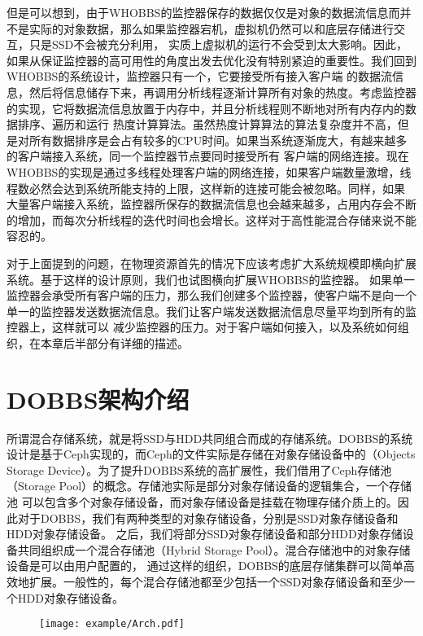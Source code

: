 但是可以想到，由于WHOBBS的监控器保存的数据仅仅是对象的数据流信息而并不是实际的对象数据，那么如果监控器宕机，虚拟机仍然可以和底层存储进行交互，只是SSD不会被充分利用，
实质上虚拟机的运行不会受到太大影响。因此，如果从保证监控器的高可用性的角度出发去优化没有特别紧迫的重要性。我们回到WHOBBS的系统设计，监控器只有一个，它要接受所有接入客户端
的数据流信息，然后将信息储存下来，再调用分析线程逐渐计算所有对象的热度。考虑监控器的实现，它将数据流信息放置于内存中，并且分析线程则不断地对所有内存内的数据排序、遍历和运行
热度计算算法。虽然热度计算算法的算法复杂度并不高，但是对所有数据排序是会占有较多的CPU时间。如果当系统逐渐庞大，有越来越多的客户端接入系统，同一个监控器节点要同时接受所有
客户端的网络连接。现在WHOBBS的实现是通过多线程处理客户端的网络连接，如果客户端数量激增，线程数必然会达到系统所能支持的上限，这样新的连接可能会被忽略。同样，如果
大量客户端接入系统，监控器所保存的数据流信息也会越来越多，占用内存会不断的增加，而每次分析线程的迭代时间也会增长。这样对于高性能混合存储来说不能容忍的。

对于上面提到的问题，在物理资源首先的情况下应该考虑扩大系统规模即横向扩展系统。基于这样的设计原则，我们也试图横向扩展WHOBBS的监控器。
如果单一监控器会承受所有客户端的压力，那么我们创建多个监控器，使客户端不是向一个单一的监控器发送数据流信息。我们让客户端发送数据流信息尽量平均到所有的监控器上，这样就可以
减少监控器的压力。对于客户端如何接入，以及系统如何组织，在本章后半部分有详细的描述。

\section{DOBBS架构介绍}
所谓混合存储系统，就是将SSD与HDD共同组合而成的存储系统。DOBBS的系统设计是基于Ceph实现的，而Ceph的文件实际是存储在对象存储设备中的（Objects 
Storage Device）。为了提升DOBBS系统的高扩展性，我们借用了Ceph存储池（Storage Pool）的概念。存储池实际是部分对象存储设备的逻辑集合，一个存储池
可以包含多个对象存储设备，而对象存储设备是挂载在物理存储介质上的。因此对于DOBBS，我们有两种类型的对象存储设备，分别是SSD对象存储设备和HDD对象存储设备。
之后，我们将部分SSD对象存储设备和部分HDD对象存储设备共同组织成一个混合存储池（Hybrid Storage Pool）。混合存储池中的对象存储设备是可以由用户配置的，
通过这样的组织，DOBBS的底层存储集群可以简单高效地扩展。一般性的，每个混合存储池都至少包括一个SSD对象存储设备和至少一个HDD对象存储设备。

\begin{figure}[!htp]
    \centering
    \texttt{[image: example/Arch.pdf]}
   \end{figure}

